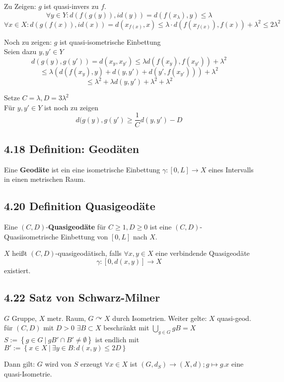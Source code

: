 \documentclass{article}
\newcommand{\df}[1]{\textbf{#1}\index{#1}}
\newcommand{\set}[2]{\left\lbrace #1~|~#2 \right\rbrace}
\begin{document}
Zu Zeigen: $g$ ist quasi-invers zu $f$.\\
\[\forall y\in Y: d(f(g(y)), id(y)) = d(f(x_\lambda), y) \leq \lambda \]
\[\forall x\in X: d(g(f(x)), id(x)) = d(x_{f(x)}, x) \leq \lambda \cdot d(f(x_{f(x)}), f(x)) + \lambda^2 \leq 2\lambda^2 \]

Noch zu zeigen: $g$ ist quasi-isometrische Einbettung\\

Seien dazu $y,y' \in Y$
\[d(g(y),g(y')) = d(x_y, x_{y'}) \leq \lambda d(f(x_y), f(x_{y'})) + \lambda^2 \]
\[\leq \lambda \left( d(f(x_y),y) + d(y, y') + d(y', f(x_{y'})) \right) + \lambda^2\]
\[\leq \lambda^2 + \lambda d(y, y') + \lambda^2 + \lambda^2 \]

Setze $C = \lambda, D = 3\lambda^2$\\

Für $y,y' \in Y$ ist noch zu zeigen
\[d(g(y),g(y') \geq \frac{1}{C} d(y,y') - D \]


\subsection{4.18 Definition: Geodäten}
Eine \df{Geodäte} ist ein eine isometrische Einbettung $\gamma : [0,L] \rightarrow X$ eines Intervalls in einen metrischen Raum.

\subsection{4.20 Definition Quasigeodäte}
Eine $(C,D)$-\df{Quasigeodäte} für $C\geq 1, D \geq 0$ ist eine $(C,D)$-Quasiisometrische Einbettung von $[0,L]$ nach $X$.

$X$ heißt $(C,D)$-quasigeodätisch, falls $\forall x,y \in X$ eine verbindende Quasigeodäte \[\gamma :[0,d(x,y)] \rightarrow X \] existiert.

\subsection{4.22 Satz von Schwarz-Milner}
$G$ Gruppe, $X$ metr. Raum, $G\curvearrowright X$ durch Isometrien.
Weiter gelte:
$X$ quasi-geod. für $(C,D)$ mit $D > 0$
$\exists B \subset X$ beschränkt mit $\bigcup_{g\in G}gB = X$
$S:=\set{g\in G}{gB' \cap B' \neq \emptyset}$ ist endlich mit $B' := \set{x\in X}{\exists y \in B: d(x,y) \leq 2D}$

Dann gilt:
$G$ wird von $S$ erzeugt
$\forall x \in X$ ist $(G,d_S) \rightarrow (X,d); g \mapsto g.x$ eine quasi-Isometrie.
\end{document}
